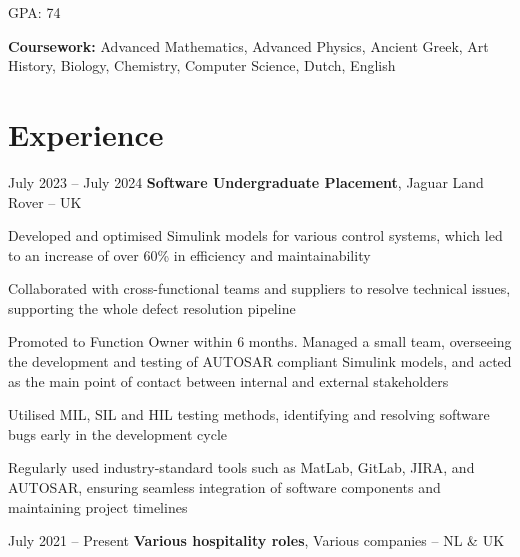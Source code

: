 	\vspace{0.10 cm}
	\begin{onecolentry}
		\begin{highlights}
			\item GPA: 74
			\item \textbf{Coursework:} Advanced Mathematics, Advanced Physics, Ancient Greek, Art History, Biology, Chemistry, Computer Science, Dutch, English
		\end{highlights}
	\end{onecolentry}
	
	\section{Experience}
		
	
	\begin{twocolentry}{
			July 2023 – July 2024
		}
		\textbf{Software Undergraduate Placement}, Jaguar Land Rover -- UK
	\end{twocolentry}
	
	\vspace{0.10 cm}
	\begin{onecolentry}
		\begin{highlights}
			\item Developed and optimised Simulink models for various control systems, which led to an increase of over 60\% in efficiency and maintainability
			\item Collaborated with cross-functional teams and suppliers to resolve technical issues, supporting the whole defect resolution pipeline
			\item Promoted to Function Owner within 6 months. Managed a small team, overseeing the development and testing of AUTOSAR compliant Simulink models, and acted as the main point of contact between internal and external stakeholders
			\item Utilised MIL, SIL and HIL testing methods, identifying and resolving software bugs early in the development cycle
			\item Regularly used industry-standard tools such as MatLab, GitLab, JIRA, and AUTOSAR, ensuring seamless integration of software components and maintaining project timelines
		\end{highlights}
	\end{onecolentry}
	
	
	\vspace{0.2 cm}
	
	\begin{twocolentry}{
			July 2021 – Present
		}
		\textbf{Various hospitality roles}, Various companies -- NL \& UK
	\end{twocolentry}
	

